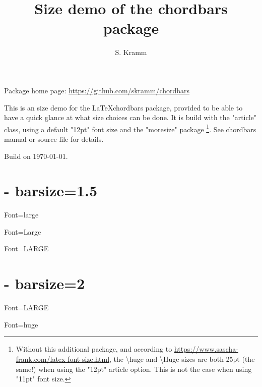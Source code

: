\documentclass[12pt]{article}
\title{Size demo of the chordbars package}
\author{S. Kramm}
\begin{document}
\countbarsNo

\songtitle

Package home page: \url{https://github.com/skramm/chordbars}

This is an size demo for the \LaTeX chordbars package, provided to be able to have a quick glance at what size choices can be done.
It is build with the "article" class,
using a default "12pt" font size and the "moresize" package
\footnote{Without this additional package, and according to \url{https://www.sascha-frank.com/latex-font-size.html},
the \textbackslash huge and \textbackslash Huge sizes are both 25pt (the same!) when using the "12pt" article option.
This is not the case when using "11pt" font size.}.
See chordbars manual or source file for details.

Build on \today.

\section{- barsize=1.5}
\def\barsize{1.5}%

\def\chordFontSize{\large\bfseries}
\begin{chordbar}{4}{Font=large}
\end{chordbar}


\def\chordFontSize{\Large\bfseries}
\begin{chordbar}{4}{Font=Large}
\end{chordbar}

\def\chordFontSize{\LARGE\bfseries}
\begin{chordbar}{4}{Font=LARGE}
\end{chordbar}

\section{- barsize=2}
\def\barsize{2}%

\def\chordFontSize{\LARGE\bfseries}
\begin{chordbar}{4}{Font=LARGE}
\end{chordbar}

\def\chordFontSize{\huge\bfseries}
\begin{chordbar}{4}{Font=huge}
\end{chordbar}
\end{document}
